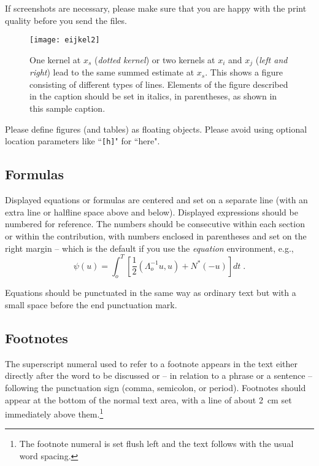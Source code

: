 \documentclass[runningheads,a4paper]{llncs}
\begin{document}
If screenshots are necessary, please make sure that you are happy with
the print quality before you send the files.
\begin{figure}
\centering
\texttt{[image: eijkel2]}
\caption{One kernel at $x_s$ (\emph{dotted kernel}) or two kernels at
$x_i$ and $x_j$ (\textit{left and right}) lead to the same summed estimate
at $x_s$. This shows a figure consisting of different types of
lines. Elements of the figure described in the caption should be set in
italics, in parentheses, as shown in this sample caption.}
\label{fig:example}
\end{figure}

Please define figures (and tables) as floating objects. Please avoid
using optional location parameters like ``\verb+[h]+" for ``here".

\subsection{Formulas}

Displayed equations or formulas are centered and set on a separate
line (with an extra line or halfline space above and below). Displayed
expressions should be numbered for reference. The numbers should be
consecutive within each section or within the contribution,
with numbers enclosed in parentheses and set on the right margin --
which is the default if you use the \emph{equation} environment, e.g.,
\begin{equation}
  \psi (u) = \int_{o}^{T} \left[\frac{1}{2}
  \left(\Lambda_{o}^{-1} u,u\right) + N^{\ast} (-u)\right] dt \;  .
\end{equation}

Equations should be punctuated in the same way as ordinary
text but with a small space before the end punctuation mark.

\subsection{Footnotes}

The superscript numeral used to refer to a footnote appears in the text
either directly after the word to be discussed or -- in relation to a
phrase or a sentence -- following the punctuation sign (comma,
semicolon, or period). Footnotes should appear at the bottom of
the
normal text area, with a line of about 2~cm set
immediately above them.\footnote{The footnote numeral is set flush left
and the text follows with the usual word spacing.}
\end{document}
